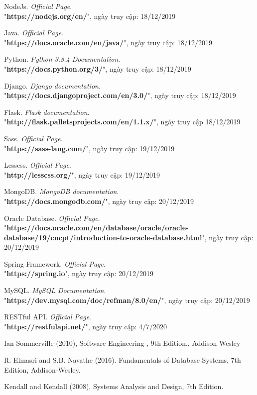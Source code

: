 \newpage
\begin{thebibliography}{80}

\bibitem{}
NodeJs. \textit{Official Page}.\\
"\textbf{https://nodejs.org/en/}", ngày truy cập: 18/12/2019

\bibitem{}
Java. \textit{Official Page}.\\
"\textbf{https://docs.oracle.com/en/java/}", ngày truy cập: 18/12/2019

\bibitem{}
Python. \textit{Python 3.8.4 Documentation}.\\
"\textbf{https://docs.python.org/3/}", ngày truy cập: 18/12/2019

\bibitem{}
Django. \textit{Django documentation}.\\
"\textbf{https://docs.djangoproject.com/en/3.0/}", ngày truy cập: 18/12/2019

\bibitem{}
Flask. \textit{Flask documentation}.\\
"\textbf{http://flask.palletsprojects.com/en/1.1.x/}", ngày truy cập 18/12/2019


\bibitem{}
Sass. \textit{Official Page}.\\
"\textbf{https://sass-lang.com/}", ngày truy cập: 19/12/2019

\bibitem{}
Lesscss. \textit{Official Page}.\\
"\textbf{http://lesscss.org/}", ngày truy cập: 19/12/2019

\bibitem{}
MongoDB. \textit{MongoDB documentation}.\\
"\textbf{https://docs.mongodb.com/}", ngày truy cập: 20/12/2019

\bibitem{}
Oracle Database. \textit{Official Page}.\\
"\textbf{https://docs.oracle.com/en/database/oracle/oracle-database/19/cncpt/introduction-to-oracle-database.html}", ngày truy cập: 20/12/2019

\bibitem{}
Spring Framework. \textit{Official Page}.\\
"\textbf{https://spring.io}", ngày truy cập: 20/12/2019

\bibitem{}
MySQL. \textit{MySQL Documentation}.\\
"\textbf{https://dev.mysql.com/doc/refman/8.0/en/}", ngày truy cập: 20/12/2019

\bibitem{}
RESTful API. \textit{Official Page}.\\
"\textbf{https://restfulapi.net/}", ngày truy cập: 4/7/2020

\bibitem{}
Ian Sommerville (2010), Software Engineering , 9th Edition,, Addison Wesley

\bibitem{}
R. Elmasri and S.B. Navathe (2016). Fundamentals of Database Systems, 7th Edition, Addison-Wesley.

\bibitem{}
 Kendall and Kendall (2008), Systems Analysis and Design, 7th Edition.

\end{thebibliography}
